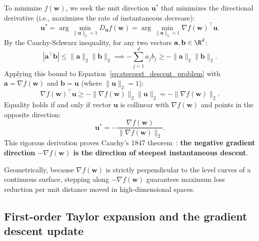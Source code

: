 To minimize $f(\mathbf{w})$, we seek the unit direction $\mathbf{u}^*$ that minimizes the directional derivative (i.e., maximizes the rate of instantaneous decrease):
\begin{equation}
\mathbf{u}^* = \arg\min_{\|\mathbf{u}\|_2 = 1} D_\mathbf{u} f(\mathbf{w}) = \arg\min_{\|\mathbf{u}\|_2 = 1} \nabla f(\mathbf{w})^\top \mathbf{u}.
\label{eq:steepest_descent_problem}
\end{equation}
By the Cauchy-Schwarz inequality, for any two vectors $\mathbf{a}, \mathbf{b} \in \R^d$:
\begin{equation}
|\mathbf{a}^\top \mathbf{b}| \le \|\mathbf{a}\|_2 \|\mathbf{b}\|_2 \implies -\sum_{j=1}^d a_j b_j \ge -\|\mathbf{a}\|_2 \|\mathbf{b}\|_2.
\end{equation}
Applying this bound to Equation~\eqref{eq:steepest_descent_problem} with $\mathbf{a} = \nabla f(\mathbf{w})$ and $\mathbf{b} = \mathbf{u}$ (where $\|\mathbf{u}\|_2 = 1$):
\begin{equation}
\nabla f(\mathbf{w})^\top \mathbf{u} \ge -\|\nabla f(\mathbf{w})\|_2 \|\mathbf{u}\|_2 = -\|\nabla f(\mathbf{w})\|_2.
\label{eq:cauchy_schwarz_lower_bound}
\end{equation}
Equality holds if and only if vector $\mathbf{u}$ is collinear with $\nabla f(\mathbf{w})$ and points in the opposite direction:
\begin{equation}
\mathbf{u}^* = -\frac{\nabla f(\mathbf{w})}{\|\nabla f(\mathbf{w})\|_2}.
\label{eq:steepest_descent_direction}
\end{equation}
This rigorous derivation proves Cauchy's 1847 theorem~\cite{cauchy1847methode}: \textbf{the negative gradient direction $-\nabla f(\mathbf{w})$ is the direction of steepest instantaneous descent}.

Geometrically, because $\nabla f(\mathbf{w})$ is strictly perpendicular to the level curves of a continuous surface, stepping along $-\nabla f(\mathbf{w})$ guarantees maximum loss reduction per unit distance moved in high-dimensional spaces.

\subsection{First-order Taylor expansion and the gradient descent update}
\label{sec:first_order_taylor}

